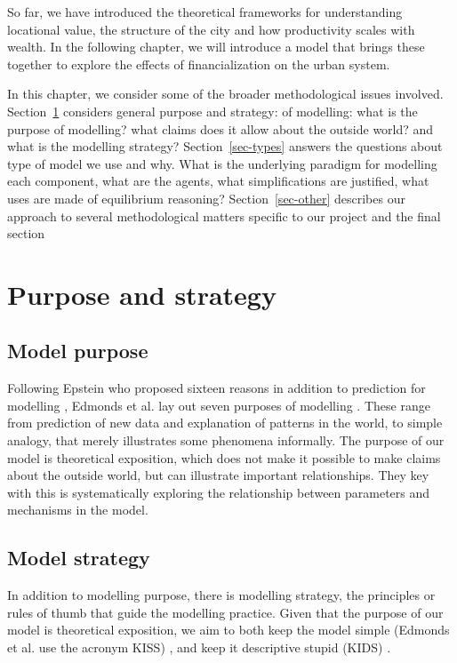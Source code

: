 So far, we have introduced the theoretical frameworks for understanding locational value, the structure of the city and how productivity scales with wealth. In the following chapter, we will introduce a model that brings these together to explore the effects of financialization on the urban system. 

In this chapter, we consider some of the broader methodological issues involved. Section~\ref{sec-purpose} considers general purpose and strategy: of modelling: what is the purpose of modelling? what claims does it allow about the outside world? and  what is the modelling strategy? Section~\ref{sec-types} answers the questions about type of model we use and why. What is the underlying paradigm for modelling each component, what are the agents, what simplifications are justified, what uses are made of equilibrium reasoning? 
Section~\ref{sec-other} describes our approach to several methodological matters specific to our project  and the final section 

\section{Purpose and strategy}\label{sec-purpose}
\subsection{Model purpose}
Following Epstein who proposed sixteen reasons in addition to prediction for modelling  \cite{epsteinWhyModel2008}, Edmonds et al. lay out seven purposes of modelling \cite{edmondsDifferentModellingPurposes2019}. These range from prediction of new data and explanation of patterns in the world, to simple analogy, that merely illustrates some phenomena informally. The purpose of our model is theoretical exposition, %
which does not make it possible to make claims about the outside world, but can illustrate important relationships. They key with this is systematically exploring the relationship between parameters and mechanisms in the model. 


\subsection{Model strategy}

In addition to modelling purpose, there is modelling strategy, the principles or rules of thumb that guide the modelling practice. Given that the purpose of our model is theoretical exposition, we aim to both keep the model simple (Edmonds et al. use the acronym KISS) \cite{edmondsDifferentModellingPurposes2019}, and keep it descriptive stupid (KIDS) \cite{edmondsDifferentModellingPurposes2019}. %


